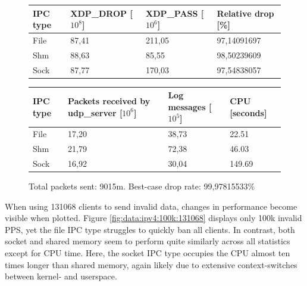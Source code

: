 \begin{figure}[!h]
	\centering
	\scriptsize
	\begin{tabular}{llll}
		\toprule
		\textbf{IPC type} & \textbf{XDP\_DROP [$10^8$]} & \textbf{XDP\_PASS [$10^6$]} & \textbf{Relative drop [\%]} \\ \midrule 
		File & 87,41 & 211,05 & 97,14091697 \\
        Shm & 88,63 & 85,55 & 98,50239609 \\
        Sock & 87,77 & 170,03 & 97,54838057 \\
	\bottomrule
	\end{tabular}
    \begin{tabular}{llll}
		\toprule
		\textbf{IPC type} & \textbf{Packets received by udp\_server [$10^6$]} & \textbf{Log messages [$10^5$]} & \textbf{CPU [seconds]} \\ \midrule 
		File & 17,20 & 38,73 & 22.51 \\
        Shm & 21,79 & 72,38 & 46.03 \\
        Sock & 16,92 & 30,04 & 149.69 \\
	\bottomrule
	\end{tabular}
	\caption[Simplefail2ban, IPv6, 30m \ac{PPS}, 65534 malicious clients]{Total packets sent: 9015m. Best-case drop rate: 99,97815533\%}
	\label{fig:data:ipv6:30m:65534}
\end{figure}

When using 131068 clients to send invalid data, changes in performance become visible when plotted.
Figure \ref{fig:data:ipv4:100k:131068} displays only 100k invalid \ac{PPS}, yet the file \ac{IPC} type struggles to quickly ban all clients.
In contrast, both socket and shared memory seem to perform quite similarly across all statistics except for \ac{CPU} time.
Here, the socket \ac{IPC} type occupies the \ac{CPU} almost ten times longer than shared memory, again likely due to extensive context-switches between kernel- and userspace.

